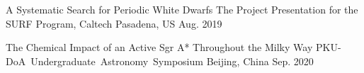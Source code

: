 


\begin{cventries}
	
	
	\cventry
	{A Systematic Search for Periodic White Dwarfs} %
	{The Project Presentation for the SURF Program, Caltech} %
	{Pasadena, US} %
	{Aug. 2019} %
	{}

	\cventry
	{The Chemical Impact of an Active Sgr A*  Throughout the Milky Way} %
	{PKU-DoA Undergraduate Astronomy Symposium} %
	{Beijing, China} %
	{Sep. 2020} %
	{}

\end{cventries}